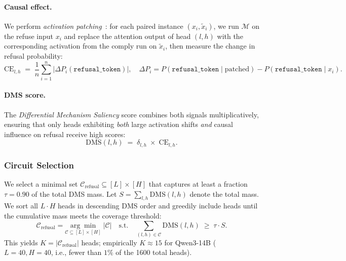 \documentclass[11pt]{article}
\begin{document}
\paragraph{Causal effect.} We perform \emph{activation patching}~\citep{meng2022locating,conmy2023towards}: for each paired instance $(x_i, \tilde{x}_i)$, we run $\mathcal{M}$ on the refuse input $x_i$ and replace the attention output of head $(l,h)$ with the corresponding activation from the comply run on $\tilde{x}_i$, then measure the change in refusal probability:
\begin{equation}
\label{eq:causal}
\mathrm{CE}_{l,h} \;=\; \frac{1}{n}\sum_{i=1}^{n}\big|\Delta P_i\!\left(\texttt{refusal\_token}\right)\big|, \quad \Delta P_i = P\!\left(\texttt{refusal\_token}\mid \text{patched}\right) - P\!\left(\texttt{refusal\_token}\mid x_i\right).
\end{equation}

\paragraph{DMS score.} The \emph{Differential Mechanism Saliency} score combines both signals multiplicatively, ensuring that only heads exhibiting \emph{both} large activation shifts \emph{and} causal influence on refusal receive high scores:
\begin{equation}
\label{eq:dms}
\mathrm{DMS}(l,h) \;=\; \delta_{l,h}\;\times\;\mathrm{CE}_{l,h}.
\end{equation}

\subsubsection{Circuit Selection}
\label{subsubsec:circuit}

We select a minimal set $\mathcal{C}_{\mathrm{refusal}}\subseteq[L]\times[H]$ that captures at least a fraction $\tau{=}0.90$ of the total DMS mass. Let $S = \sum_{l,h}\mathrm{DMS}(l,h)$ denote the total mass. We sort all $L\!\cdot\!H$ heads in descending DMS order and greedily include heads until the cumulative mass meets the coverage threshold:
\begin{equation}
\label{eq:circuit_select}
\mathcal{C}_{\mathrm{refusal}} = \underset{\mathcal{C}\subseteq[L]\times[H]}{\arg\min}\;|\mathcal{C}| \quad\text{s.t.}\quad \sum_{(l,h)\in\mathcal{C}}\mathrm{DMS}(l,h) \;\geq\; \tau \cdot S.
\end{equation}
This yields $K=|\mathcal{C}_{\mathrm{refusal}}|$ heads; empirically $K\approx 15$ for Qwen3-14B ($L{=}40, H{=}40$, i.e., fewer than $1\%$ of the 1600 total heads).
\end{document}

